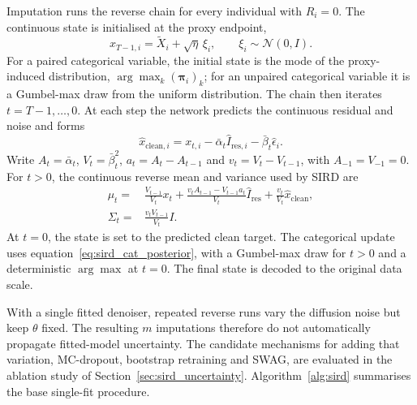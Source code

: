 Imputation runs the reverse chain for every individual with \(R_i=0\). The continuous state is initialised at the proxy endpoint,
\[
x_{T-1,i}=\tilde{X}_i+\sqrt{\eta}\,\xi_i,\qquad \xi_i\sim\mathcal{N}(0,I).
\]
For a paired categorical variable, the initial state is the mode of the proxy-induced distribution, \(\arg\max_k(\boldsymbol{\pi}_i)_k\); for an unpaired categorical variable it is a Gumbel-max draw from the uniform distribution. The chain then iterates \(t=T-1,\ldots,0\). At each step the network predicts the continuous residual and noise and forms
\[
\hat{x}_{\mathrm{clean},i}=x_{t,i}-\bar{\alpha}_t\hat I_{\mathrm{res},i}-\bar{\beta}_t\hat\epsilon_i.
\]
Write $A_t=\bar\alpha_t$, $V_t=\bar\beta_t^2$, $a_t=A_t-A_{t-1}$ and $v_t=V_t-V_{t-1}$, with $A_{-1}=V_{-1}=0$. For $t>0$, the continuous reverse mean and variance used by SIRD are
\begin{equation}
\begin{aligned}
\mu_t={}&\frac{V_{t-1}}{V_t}x_t
+\frac{v_tA_{t-1}-V_{t-1}a_t}{V_t}\hat I_{\mathrm{res}}
+\frac{v_t}{V_t}\hat x_{\mathrm{clean}},\\
\Sigma_t={}&\frac{v_tV_{t-1}}{V_t}I.
\end{aligned}
\label{eq:sird_cont_posterior}
\end{equation}
At $t=0$, the state is set to the predicted clean target. The categorical update uses equation~\eqref{eq:sird_cat_posterior}, with a Gumbel-max draw for $t>0$ and a deterministic $\arg\max$ at $t=0$. The final state is decoded to the original data scale.

With a single fitted denoiser, repeated reverse runs vary the diffusion noise but keep \(\theta\) fixed. The resulting \(m\) imputations therefore do not automatically propagate fitted-model uncertainty. The candidate mechanisms for adding that variation, MC-dropout, bootstrap retraining and SWAG, are evaluated in the ablation study of Section~\ref{sec:sird_uncertainty}. Algorithm~\ref{alg:sird} summarises the base single-fit procedure.

